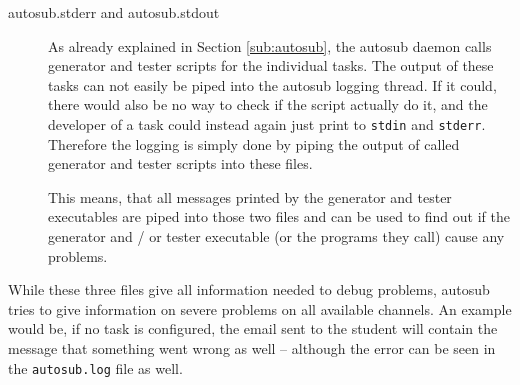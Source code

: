 \begin{description}
\item [autosub.stderr and autosub.stdout] As already explained in Section \ref{sub:autosub},
the autosub daemon calls generator and tester scripts for the individual tasks.
The output of these tasks can not easily be piped into the autosub logging thread.
If it could, there would also be no way to check if the script actually do it,
and the developer of a task could instead again just print to {\tt stdin} and
{\tt stderr}. Therefore the logging is simply done by piping the output of called
generator and tester scripts into these files.

This means, that all messages printed by the generator and tester executables are
piped into those two files and can be used to find out if the generator and / or
tester executable (or the programs they call) cause any problems.
\end{description}

While these three files give all information needed to debug problems, autosub tries
to give information on severe problems on all available channels. An example would be,
if no task is configured, the email sent to the student will contain the message that
something went wrong as well -- although the error can be seen in the {\tt autosub.log}
file as well.
